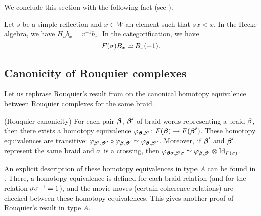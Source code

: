 We conclude this section with the following fact (see \cite[Lemma 6.5]{EWHodge}).

\begin{lemma}\label{lem:BabsorbsF}
Let $s$ be a simple reflection and $x \in W$ an element such that $sx<x$. In the Hecke algebra, we have $H_s b_x = v^{-1} b_x$. In the categorification, we have
\begin{equation} \label{eq:sdown}
F(\sigma) B_x \simeq B_x(-1).
\end{equation}
\end{lemma}



\subsection{Canonicity of Rouquier complexes}
\label{subsec:RouqCanon}

Let us rephrase Rouquier's result from \cite{Rou04} on the canonical homotopy equivalence between Rouquier complexes for the same braid.

\begin{prop}(Rouquier canonicity)  For each pair $\boldsymbol{\beta}$, $\boldsymbol{\beta}'$ of braid words representing a braid $\beta$, then there exists a homotopy equivalence $\varphi_{\boldsymbol{\beta},\boldsymbol{\beta}'} \colon F(\boldsymbol{\beta}) \rightarrow F(\boldsymbol{\beta}')$.  These homotopy equivalences are transitive: $\varphi_{\boldsymbol{\beta}',\boldsymbol{\beta}''} \circ \varphi_{\boldsymbol{\beta},\boldsymbol{\beta}'} \simeq \varphi_{\boldsymbol{\beta},\boldsymbol{\beta}''}$.  Moreover, if $\boldsymbol{\beta}'$ and $\boldsymbol{\beta}'$ represent the same braid and $\sigma$ is a crossing, then $\varphi_{\boldsymbol{\beta} \sigma,\boldsymbol{\beta}' \sigma} \simeq \varphi_{\boldsymbol{\beta},\boldsymbol{\beta}'} \otimes \operatorname{Id}_{F(\sigma)}$. \end{prop}



\begin{remark} An explicit description of these homotopy equivalences in type $A$ can be found in \cite{EKra}. There, a homotopy equivalence is defined for each
braid relation (and for the relation $\sigma \sigma^{-1} = 1$), and the movie moves (certain coherence relations) are checked between these homotopy equivalences. This gives another proof of
Rouquier's result in type $A$. \end{remark}

